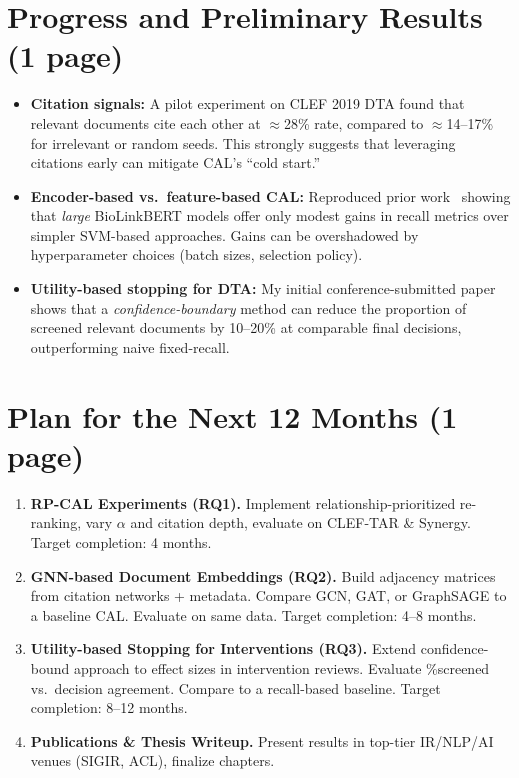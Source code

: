 \documentclass[11pt,a4paper]{article}
\begin{document}
\section{Progress and Preliminary Results (1 page)}
\begin{itemize}[leftmargin=1.5em]
\item \textbf{Citation signals:} A pilot experiment on CLEF 2019 DTA found that relevant documents cite each other at $\approx$28\% rate, compared to $\approx$14--17\% for irrelevant or random seeds. This strongly suggests that leveraging citations early can mitigate CAL’s ``cold start.''
\item \textbf{Encoder-based vs.\ feature-based CAL:} Reproduced prior work~\cite{mao_reproducibility_2024} showing that \emph{large} BioLinkBERT models offer only modest gains in recall metrics over simpler SVM-based approaches. Gains can be overshadowed by hyperparameter choices (batch sizes, selection policy).
\item \textbf{Utility-based stopping for DTA:} My initial conference-submitted paper shows that a \emph{confidence-boundary} method can reduce the proportion of screened relevant documents by 10--20\% at comparable final decisions, outperforming naive fixed-recall.
\end{itemize}

\section{Plan for the Next 12 Months (1 page)}
\begin{enumerate}[leftmargin=1.5em]
    \item \textbf{RP-CAL Experiments (RQ1).} Implement relationship-prioritized re-ranking, vary $\alpha$ and citation depth, evaluate on CLEF-TAR \& Synergy. Target completion: 4 months.
    \item \textbf{GNN-based Document Embeddings (RQ2).} Build adjacency matrices from citation networks + metadata. Compare GCN, GAT, or GraphSAGE to a baseline CAL. Evaluate on same data. Target completion: 4--8 months.
    \item \textbf{Utility-based Stopping for Interventions (RQ3).} Extend confidence-bound approach to effect sizes in intervention reviews. Evaluate \%screened vs.\ decision agreement. Compare to a recall-based baseline. Target completion: 8--12 months.
    \item \textbf{Publications \& Thesis Writeup.} Present results in top-tier IR/NLP/AI venues (SIGIR, ACL), finalize chapters.
\end{enumerate}
\end{document}
